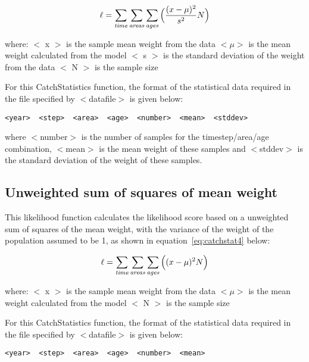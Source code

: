 \documentclass [a4paper, 10pt]{book}
\begin{document}
\begin{equation}\label{eq:catchstat3}
\ell = \sum_{\it time}\sum_{\it areas}\sum_{\it ages} \Big(\frac{(x-\mu)^2} {s^2} N\Big)
\end{equation}

where:\newline
$<$ x $>$ is the sample mean weight from the data\newline
$<\mu>$ is the mean weight calculated from the model\newline
$<$ s $>$ is the standard deviation of the weight from the data\newline
$<$ N $>$ is the sample size

\bigskip
For this CatchStatistics function, the format of the statistical data required in the file specified by $<$datafile$>$ is given below:

{\small\begin{verbatim}
<year>  <step>  <area>  <age>  <number>  <mean>  <stddev>
\end{verbatim}}

where $<$number$>$ is the number of samples for the timestep/area/age combination, $<$mean$>$ is the mean weight of these samples and $<$stddev$>$ is the standard deviation of the weight of these samples.

\subsection{Unweighted sum of squares of mean weight}
This likelihood function calculates the likelihood score based on a unweighted sum of squares of the mean weight, with the variance of the weight of the population assumed to be 1, as shown in equation~\ref{eq:catchstat4} below:

\begin{equation}\label{eq:catchstat4}
\ell = \sum_{\it time}\sum_{\it areas}\sum_{\it ages} \Big((x-\mu)^2 N\Big)
\end{equation}

where:\newline
$<$ x $>$ is the sample mean weight from the data\newline
$<\mu>$ is the mean weight calculated from the model\newline
$<$ N $>$ is the sample size

\bigskip
For this CatchStatistics function, the format of the statistical data required in the file specified by $<$datafile$>$ is given below:

{\small\begin{verbatim}
<year>  <step>  <area>  <age>  <number>  <mean>
\end{verbatim}}
\end{document}
